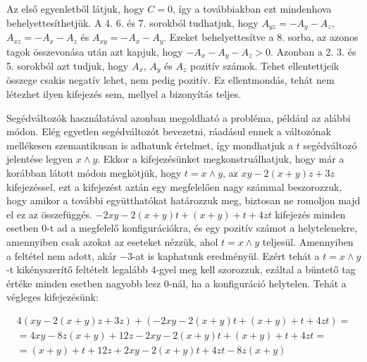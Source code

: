 Az első egyenletből látjuk, hogy $C=0$, így a továbbiakban ezt mindenhova behelyettesíthetjük. A 4. 6. és 7. sorokból tudhatjuk, hogy $A_{yz}=-A_y-A_z$, $A_{xz}=-A_x-A_z$ és $A_{xy}=-A_x-A_y$. Ezeket behelyettesítve a 8. sorba, az azonos tagok összevonása után azt kapjuk, hogy $-A_x-A_y-A_z>0$.
Azonban a 2. 3. és 5. sorokból azt tudjuk, hogy $A_x$, $A_y$ és $A_z$ pozitív számok. Tehet ellentettjeik összege csakis negatív lehet, nem pedig pozitív. Ez ellentmondás, tehát nem létezhet ilyen kifejezés sem, mellyel a bizonyítás teljes.

Segédváltozók használatával azonban megoldható a probléma, például az alábbi módon. Elég egyetlen segédváltozót bevezetni, ráadásul ennek a változónak mellékesen szemantikusan is adhatunk értelmet, így mondhatjuk a $t$ segédváltozó jelentése legyen $x \wedge y$.
Ekkor a kifejezésünket megkonstruálhatjuk, hogy már a korábban látott módon megkötjük, hogy $t = x \wedge y$, az $xy-2(x+y)z+3z$ kifejezéssel, ezt a kifejezést aztán egy megfelelően nagy számmal beszorozzuk, hogy amikor a további együtthatókat határozzuk meg, biztosan ne romoljon majd el ez az összefüggés. $-2xy-2(x+y)t+(x+y)+t+4zt$ kifejezés minden esetben $0$-t ad a megfelelő konfigurációkra, és egy pozitív számot a helytelenekre, amennyiben csak azokat az eseteket nézzük, ahol $t = x \wedge  y$ teljesül. Amennyiben a feltétel nem adott, akár $-3$-at is kaphatunk eredményül. Ezért tehát a $t = x \wedge  y$-t kikényszerítő feltételt legalább 4-gyel meg kell szorozzuk, ezáltal a büntető tag értéke minden esetben nagyobb lesz $0$-nál, ha a konfiguráció helytelen. Tehát a végleges kifejezésünk:



\begin{align}
	4(xy-2(x+y)z+3z)+(-2xy-2(x+y)t+(x+y)+t+4zt) = \\
    = 4xy-8z(x+y)+12z-2xy-2(x+y)t+(x+y)+t+4zt = \\
	= (x+y)+t+12z+2xy-2(x+y)t+4zt-8z(x+y)
\end{align}

